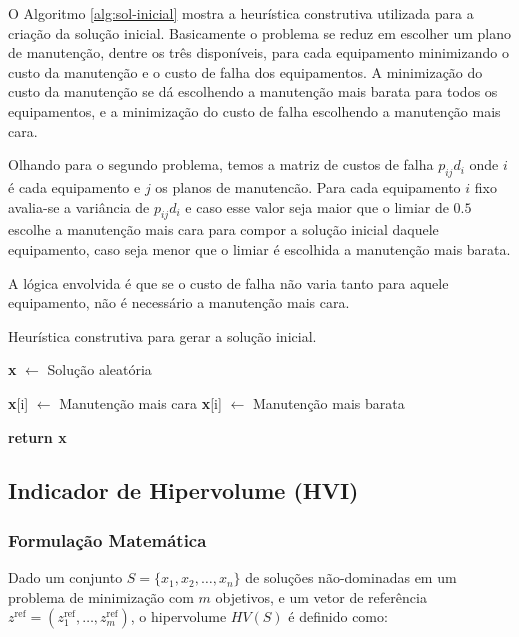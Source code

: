 \documentclass[conference]{IEEEtran}
\begin{document}
O Algoritmo \ref{alg:sol-inicial} mostra a heurística construtiva utilizada para a criação da solução inicial. Basicamente o problema se reduz
em escolher um plano de manutenção, dentre os três disponíveis, para cada equipamento minimizando o custo da manutenção e o custo de falha dos equipamentos.
A minimização do custo da manutenção se dá escolhendo a manutenção mais barata para todos os equipamentos, e a minimização do custo de falha escolhendo a manutenção mais cara.

Olhando para o segundo problema, temos a matriz de custos de falha $p_{ij}d_{i}$ onde $i$ é cada equipamento e $j$ os planos de manutencão. Para cada equipamento $i$ fixo avalia-se a
variância de $p_{ij}d_{i}$ e caso esse valor seja maior que o limiar de $0.5$ escolhe a manutenção mais cara para compor a solução inicial daquele equipamento,
caso seja menor que o limiar é escolhida a manutenção mais barata. 

A lógica envolvida é que se o custo de falha não varia tanto para aquele equipamento,
não é necessário a manutenção mais cara.

\begin{algorithm}[H]
	\caption{Heurística construtiva para gerar a solução inicial.}\label{alg:sol-inicial}
	\begin{algorithmic}[1]

	\State \textbf{x} $\gets$ Solução aleatória

			\State \textbf{x}[i] $\gets$ Manutenção mais cara
		\Else
			\State \textbf{x}[i] $\gets$ Manutenção mais barata
		\EndIf
	\EndFor
	   
	\Statex
	\State \textbf{return x} 
	\EndProcedure 
	\end{algorithmic}
\end{algorithm}

\subsection{Indicador de Hipervolume (HVI)}

\subsubsection{Formulação Matemática}

Dado um conjunto $S = \{x_1, x_2, \dots, x_n\}$ de soluções não-dominadas em um problema de minimização com $m$ objetivos, e um vetor de
referência $z^{\text{ref}} = (z_1^{\text{ref}}, \dots, z_m^{\text{ref}})$, o hipervolume $HV(S)$ é definido como:
\end{document}
